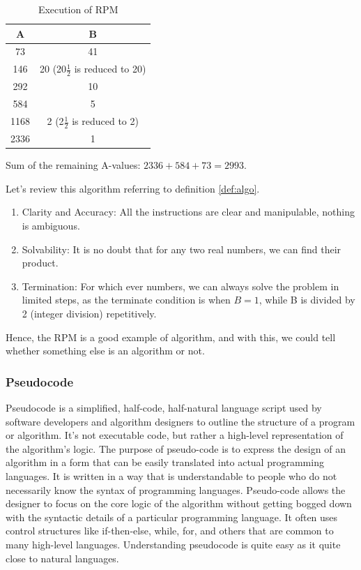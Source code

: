 \documentclass[
	12pt, %
	fleqn, %
	a4paper, %
]{LegrandOrangeBook}
\begin{document}
\begin{table}[H]
\centering
\begin{tabular}{c|c}
\hline
A & B \\
\hline
73 & 41 \\
146 & 20 (20\(\frac{1}{2}\) is reduced to 20) \\
292 & 10 \\
584 & 5 \\
1168 & 2 (2\(\frac{1}{2}\) is reduced to 2) \\
2336 & 1 \\
\hline
\end{tabular}
\caption{Execution of RPM}
\end{table}

Sum of the remaining A-values: $2336+584+73=2993$.

Let's review this algorithm referring to definition \autoref{def:algo}. 
\begin{enumerate}
    \item Clarity and Accuracy: All the instructions are clear and manipulable, nothing is ambiguous.
    
    \item Solvability: It is no doubt that for any two real numbers, we can find their product.
    
    \item Termination: For which ever numbers, we can always solve the problem in limited steps, as the terminate condition is when $B=1$, while B is divided by 2 (integer division) repetitively. 
\end{enumerate}

Hence, the RPM is a good example of algorithm, and with this, we could tell whether
something else is an algorithm or not.
\subsubsection{Pseudocode}
Pseudocode is a simplified, half-code, half-natural language script used by software developers and algorithm designers to outline the structure of a program or algorithm. It's not executable code, but rather a high-level representation of the algorithm's logic. The purpose of pseudo-code is to express the design of an algorithm in a form that can be easily translated into actual programming languages. It is written in a way that is understandable to people who do not necessarily know the syntax of programming languages. Pseudo-code allows the designer to focus on the core logic of the algorithm without getting bogged down with the syntactic details of a particular programming language. It often uses control structures like if-then-else, while, for, and others that are common to many high-level languages.
Understanding pseudocode is quite easy as it quite close to natural languages.
\end{document}
